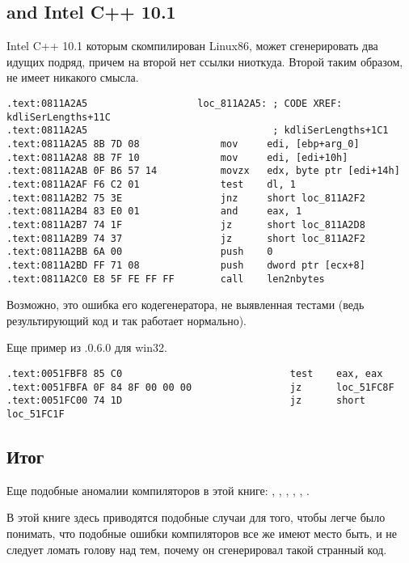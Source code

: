 \label{anomaly:Intel}
\myindex{\CompilerAnomaly}

\subsection{ and Intel C++ 10.1}

\myindex{\oracle}

Intel C++ 10.1 которым скомпилирован  Linux86, может сгенерировать два \JZ идущих подряд, 
причем на второй \JZ нет ссылки ниоткуда. Второй \JZ таким образом, не имеет никакого смысла.



\begin{lstlisting}[caption=оттуда же,style=customasmx86]
.text:0811A2A5                   loc_811A2A5: ; CODE XREF: kdliSerLengths+11C
.text:0811A2A5                                ; kdliSerLengths+1C1
.text:0811A2A5 8B 7D 08              mov     edi, [ebp+arg_0]
.text:0811A2A8 8B 7F 10              mov     edi, [edi+10h]
.text:0811A2AB 0F B6 57 14           movzx   edx, byte ptr [edi+14h]
.text:0811A2AF F6 C2 01              test    dl, 1
.text:0811A2B2 75 3E                 jnz     short loc_811A2F2
.text:0811A2B4 83 E0 01              and     eax, 1
.text:0811A2B7 74 1F                 jz      short loc_811A2D8
.text:0811A2B9 74 37                 jz      short loc_811A2F2
.text:0811A2BB 6A 00                 push    0
.text:0811A2BD FF 71 08              push    dword ptr [ecx+8]
.text:0811A2C0 E8 5F FE FF FF        call    len2nbytes
\end{lstlisting}

Возможно, это ошибка его кодегенератора, не выявленная тестами 
(ведь результирующий код и так работает нормально).

Еще пример из .0.6.0 для win32.

\begin{lstlisting}
.text:0051FBF8 85 C0                             test    eax, eax
.text:0051FBFA 0F 84 8F 00 00 00                 jz      loc_51FC8F
.text:0051FC00 74 1D                             jz      short loc_51FC1F
\end{lstlisting}




\subsection{Итог}

Еще подобные аномалии компиляторов в этой книге: 
, , ,
,
,
.

В этой книге здесь приводятся подобные случаи для того, чтобы легче было понимать, 
что подобные ошибки компиляторов 
все же имеют место быть, и не следует ломать голову над тем, почему он сгенерировал такой странный код.

